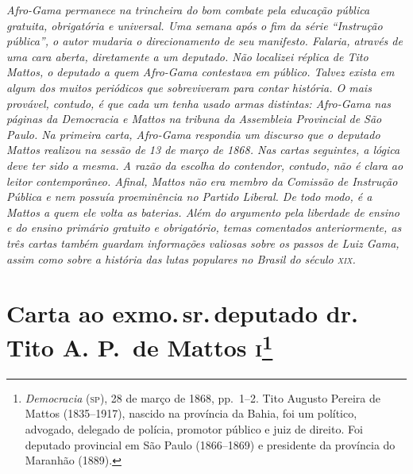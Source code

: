 \begin{argumento}\itshape
Afro-Gama permanece na trincheira do bom combate pela educação
pública gratuita, obrigatória e universal. Uma semana após o fim da
série ``Instrução pública'', o autor mudaria o direcionamento de
seu manifesto. Falaria, através de uma cara aberta, diretamente a um
deputado. Não localizei réplica de Tito Mattos, o deputado a quem
Afro-Gama contestava em público. Talvez exista em algum dos muitos
periódicos que sobreviveram para contar história. O mais provável,
contudo, é que cada um tenha usado armas distintas: Afro-Gama nas
páginas da \textnormal{Democracia} e Mattos na tribuna da Assembleia
Provincial de São Paulo. Na primeira carta, Afro-Gama respondia
um discurso que o deputado Mattos realizou na sessão de 13 de março de 1868. Nas
cartas seguintes, a lógica deve ter sido a mesma. A razão da escolha do
contendor, contudo, não é clara ao leitor contemporâneo. Afinal, Mattos
não era membro da Comissão de Instrução Pública e nem possuía
proeminência no Partido Liberal. De todo modo, é a Mattos a quem ele
volta as baterias. Além do argumento pela liberdade de ensino e do
ensino primário gratuito e obrigatório, temas comentados anteriormente,
as três cartas também guardam informações valiosas sobre os passos de
Luiz Gama, assim como sobre a história das lutas populares no Brasil do
século \textsc{xix}.
\end{argumento}

\chapter{Carta ao exmo.\,sr.\,deputado dr.\,Tito A. P.~de Mattos
\textsc{i}\footnote{\emph{Democracia} (\textsc{sp}), 28 de março de 1868, pp.~1--2. Tito
  Augusto Pereira de Mattos (1835--1917), nascido na província da Bahia,
  foi um político, advogado, delegado de polícia, promotor público e
  juiz de direito. Foi deputado provincial em São Paulo (1866--1869) e presidente da província do Maranhão (1889).}}

